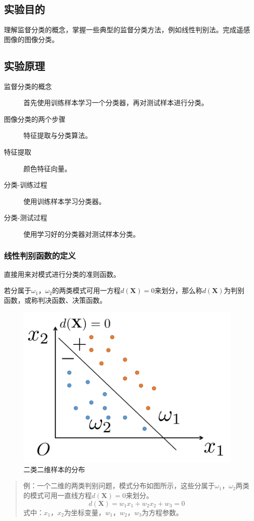 \subsection{实验目的}
理解监督分类的概念，掌握一些典型的监督分类方法，例如线性判别法。完成遥感图像的图像分类。
\subsection{实验原理}
\begin{description}
	\item[监督分类的概念] 首先使用训练样本学习一个分类器，再对测试样本进行分类。
	\item[图像分类的两个步骤] 特征提取与分类算法。
	\item[特征提取] 颜色特征向量。
	\item[分类-训练过程] 使用训练样本学习分类器。
	\item[分类-测试过程] 使用学习好的分类器对测试样本分类。
\end{description}
\subsubsection{线性判别函数的定义}
直接用来对模式进行分类的准则函数。

若分属于$\omega_1$，$\omega_2$的两类模式可用一方程$d(\mathbf{X})=0$来划分，那么称$d(\mathbf{X})$为判别函数，或称判决函数、决策函数。
\begin{figure}[H]
	\centering
	\includegraphics[width=0.7\linewidth]{figure/exp5classification}
	\caption{二类二维样本的分布}
	\label{fig:exp5classification}
\end{figure}
\begin{quote}
	\kaishu 例：一个二维的两类判别问题，模式分布如图所示，这些分属于$\omega_1$，$\omega_2$两类的模式可用一直线方程$d(\mathbf{X})=0$来划分。
	\[ d(\mathbf{X})=w_1x_1+w_2x_2+w_3=0 \]
	式中：$x_1$，$x_2$为坐标变量，$w_1$，$w_2$，$w_3$为方程参数。
\end{quote}
